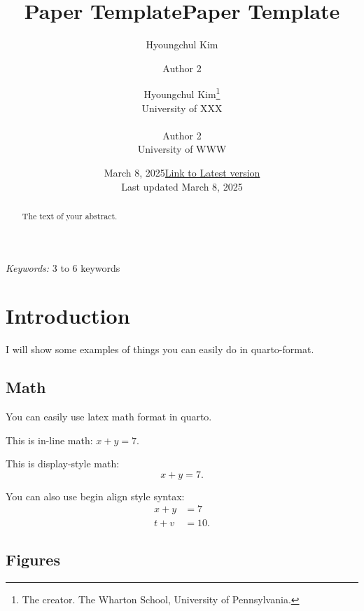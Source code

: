 \documentclass[
  11pt]{article}
\title{Paper Template}
\author{Hyoungchul Kim \and Author 2}
\date{March 8, 2025}
\begin{document}
\def\spacingset#1{\renewcommand{\baselinestretch}%
{#1}\small\normalsize} \spacingset{1}



\date{\href{https://hchulkim.github.io}{Link to Latest version}\\ \vspace{1em} Last updated March
8, 2025}
\title{Paper Template}
\author{
Hyoungchul Kim\thanks{The creator. The Wharton School, University of
Pennsylvania.}\\
University of XXX\\
\\Author 2\\
University of WWW\\
}
\maketitle

\bigskip
\bigskip
\begin{abstract}
The text of your abstract.
\end{abstract}

\noindent%
{\it Keywords:} 3 to 6 keywords
\vfill

\newpage
\spacingset{1.2} %

\section{Introduction}\label{sec-intro}

I will show some examples of things you can easily do in quarto-format.

\subsection{Math}\label{math}

You can easily use latex math format in quarto.

This is in-line math: \(x + y = 7\).

This is display-style math: \[x + y = 7.\]

You can also use begin align style syntax: \begin{align}
  x + y &= 7\\
  t + v &= 10.
\end{align}

\subsection{Figures}\label{figures}
\end{document}
